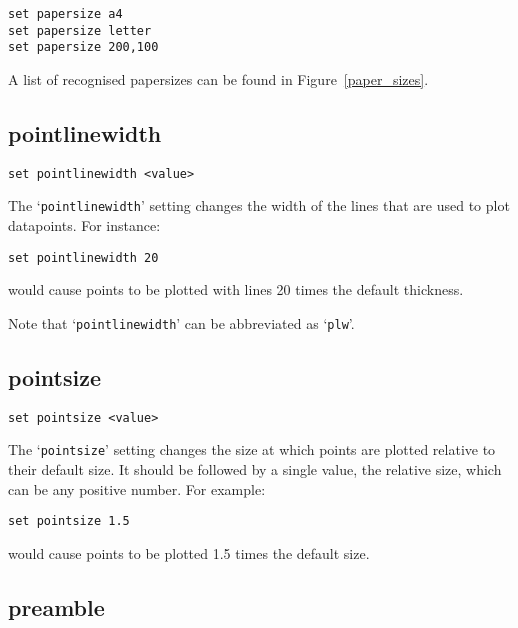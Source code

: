 \documentclass[a4paper,onecolumn,11pt]{book}
\begin{document}
\begin{verbatim}
set papersize a4
set papersize letter
set papersize 200,100
\end{verbatim}

A list of recognised papersizes can be found in Figure~\ref{paper_sizes}.

\subsection{pointlinewidth}

\begin{verbatim}
set pointlinewidth <value>
\end{verbatim}

The `{\tt pointlinewidth}' setting changes the width of the lines that are used to
plot datapoints.  For instance:

\begin{verbatim}
set pointlinewidth 20
\end{verbatim}

\noindent would cause points to be plotted with lines 20 times the default thickness.

Note that `{\tt pointlinewidth}' can be abbreviated as `{\tt plw}'.

\subsection{pointsize}

\begin{verbatim}
set pointsize <value>
\end{verbatim}

The `{\tt pointsize}' setting changes the size at which points are plotted
relative to their default size. It should be followed by a single value, the
relative size, which can be any positive number. For example:

\begin{verbatim}
set pointsize 1.5
\end{verbatim}

\noindent would cause points to be plotted 1.5 times the default size.

\subsection{preamble}
\end{document}
